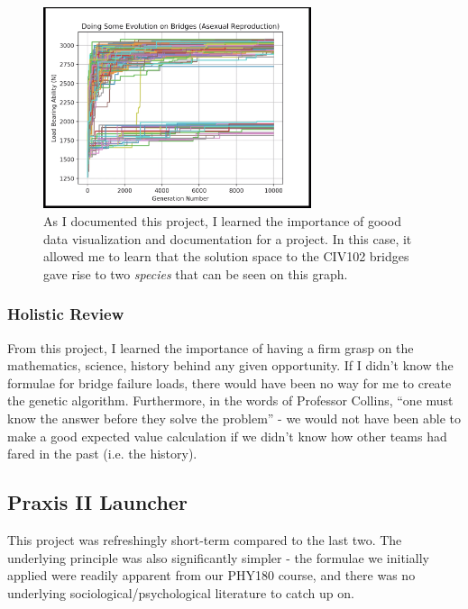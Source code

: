 \documentclass[a4paper,12pt]{article}
\begin{document}
\begin{figure}[H]
\centering
\includegraphics[width=0.7\textwidth]{img/image006.png}
\caption{As I documented this project, I learned the importance of goood data visualization and documentation for a project. In this case, it allowed me to learn that the solution space to the CIV102 bridges gave rise to two \textit{species} that can be seen on this graph.}
\label{}
\end{figure}

\subsubsection{Holistic Review}
From this project, I learned the importance of having a firm grasp on the {mathematics, science, history} behind any given opportunity. If I didn’t know the formulae for bridge failure loads, there would have been no way for me to create the genetic algorithm. Furthermore, in the words of Professor Collins, “one must know the answer before they solve the problem” - we would not have been able to make a good expected value calculation if we didn’t know how other teams had fared in the past (i.e. the history).

\subsection{Praxis II Launcher}
This project was refreshingly short-term compared to the last two. The underlying principle was also significantly simpler - the formulae we initially applied were readily apparent from our PHY180 course, and there was no underlying sociological/psychological literature to catch up on.
\end{document}
